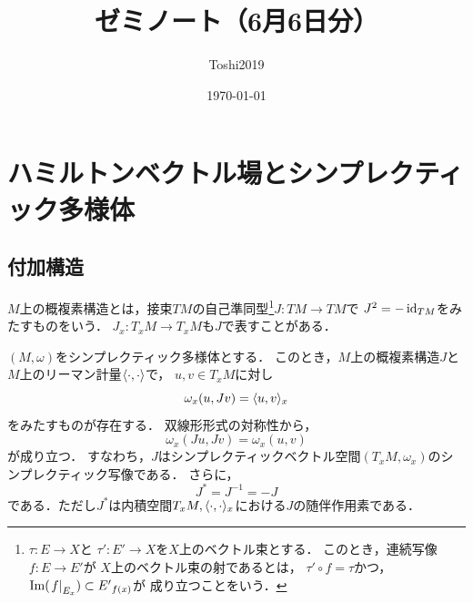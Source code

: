 \newcommand{\cotn}[1][]{\dot{T}^{\ast}{#1}}


\newcommand{\muhom}{\mu hom}
\newcommand{\muHom}[1][]{\mathrm{Hom}^\mu_{\raise1.5ex\hbox to.1em{}#1}}

\newcommand{\mucat}[2][]{\mathsf{D}^{\mathrm{b}}_{#1}(#2)}

\newcommand{\conv}[1][]{\mathbin{\mathop{\circ}\limits_{#1}}}

\newcommand{\torus}{\mathbf{T}}




\title{ゼミノート（6月6日分）}
\author{Toshi2019}
\date{\today}

\maketitle
\tableofcontents
\section{ハミルトンベクトル場とシンプレクティック多様体}
\subsection*{付加構造}
\(M\)上の概複素構造とは，接束\(TM\)の自己準同型\footnote{
    \(\tau\colon E\to X\)と
    \(\tau'\colon E'\to X\)を\(X\)上のベクトル束とする．
    このとき，連続写像\(f\colon E\to E'\)が
    \(X\)上のベクトル束の射であるとは，
    \(\tau'\circ f=\tau\)かつ，
    \(\im(\mres[f]{{E}_{x}})\subset {E'}_{f(x)}\)が
    成り立つことをいう．
}\(J\colon TM\to TM\)で
\(J^2=-\id_{TM}\)をみたすものをいう．
\(J_x\colon T_{x}M\to T_{x}M\)も\(J\)で表すことがある．

\begin{PRP}
    \((M,\omega)\)をシンプレクティック多様体とする．
    このとき，\(M\)上の概複素構造\(J\)と
    \(M\)上のリーマン計量\(\inner<\cdot,\cdot>\)で，
    \(u,v\in T_{x}M\)に対し\begin{equation}
        \omega_{x}(u,Jv)=\inner<u,v>_{x}\label{eq:1.34}
    \end{equation}
    をみたすものが存在する．
    双線形形式の対称性から，
    \begin{equation}
        \omega_{x}(Ju,Jv)=\omega_{x}(u,v)\label{eq:1.35}
    \end{equation}
    が成り立つ．
    すなわち，\(J\)はシンプレクティックベクトル空間\(
        (T_{x}M,\omega_x)
    \)のシンプレクティック写像である．
    さらに，
    \begin{equation}
        J^{\ast}=J^{-1}=-J\label{eq:1.36}
    \end{equation}
    である．ただし\(J^{\ast}\)は内積空間\(
        T_{x}M,\inner<\cdot,\cdot>_{x}
    \)における\(J\)の随伴作用素である．
\end{PRP}

